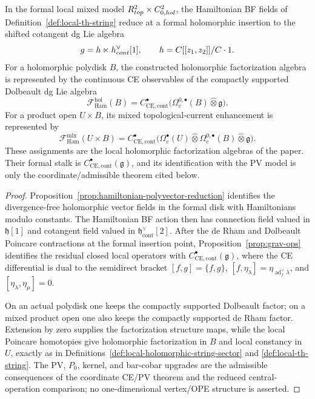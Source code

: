 \documentclass[11pt]{memoir}
\begin{document}
\begin{prop}\label{prop:local-hamiltonian-factorization-observables}
  In the formal local mixed model
  \(R^2_{top}\times C^2_{0,hol}\), the
  Hamiltonian BF fields of Definition~\ref{def:local-th-string} reduce
  at a formal holomorphic insertion to the shifted cotangent dg Lie
  algebra
  \[
    g=h\ltimes
    h^\vee_{cont}[1],
    \qquad
    h=C[[z_1,z_2]]/C\cdot1 .
  \]
  For a holomorphic polydisk \(B\), the constructed holomorphic
  factorization algebra is represented by the continuous CE observables
  of the compactly supported Dolbeault dg Lie algebra
  \[
    \mathcal F_{\mathrm{Ham}}^{\mathrm{hol}}(B)
    =
    C^\bullet_{\mathrm{CE},\mathrm{cont}}
    \bigl(\Omega_c^{0,\bullet}(B)\widehat\otimes\mathfrak g\bigr).
  \]
  For a product open \(U\times B\), its mixed topological-current
  enhancement is represented by
  \[
    \mathcal F_{\mathrm{Ham}}^{\mathrm{mix}}(U\times B)
    =
    C^\bullet_{\mathrm{CE},\mathrm{cont}}
    \bigl(
      \Omega_c^\bullet(U)\widehat\otimes
      \Omega_c^{0,\bullet}(B)\widehat\otimes\mathfrak g
    \bigr).
  \]
  These assignments are the local holomorphic factorization algebras of
  the paper.  Their formal stalk is
  \(C^\bullet_{\mathrm{CE},\mathrm{cont}}(\mathfrak g)\), and its
  identification with the PV model is only the coordinate/admissible
  theorem cited below.
\end{prop}

\begin{proof}
  Proposition~\ref{prop:hamiltonian-polyvector-reduction} identifies the
  divergence-free holomorphic vector fields in the formal disk with
  Hamiltonians modulo constants.  The Hamiltonian BF action then has
  connection field valued in \(\mathfrak h[1]\) and cotangent field valued
  in \(\mathfrak h^\vee_{\mathrm{cont}}[2]\).  After the de Rham and
  Dolbeault Poincare contractions at the formal insertion point,
  Proposition~\ref{prop:grav-ops} identifies the residual closed local
  operators with
  \(C^\bullet_{\mathrm{CE},\mathrm{cont}}(\mathfrak g)\), where the CE
  differential is dual to the semidirect bracket
  \([f,g]=\{f,g\}\), \([f,\eta_\lambda]
  =\eta_{\operatorname{ad}^{\vee}_f\lambda}\), and
  \([\eta_\lambda,\eta_\mu]=0\).

  On an actual polydisk one keeps the compactly supported Dolbeault
  factor; on a mixed product open one also keeps the compactly supported
  de Rham factor.  Extension by zero supplies the factorization structure
  maps, while the local Poincare homotopies give holomorphic
  factorization in \(B\) and local constancy in \(U\), exactly as in
  Definitions~\ref{def:local-holomorphic-string-sector} and
  \ref{def:local-th-string}.  The PV, \(P_0\), kernel, and bar-cobar
  upgrades are the admissible consequences of the coordinate CE/PV theorem
  and the reduced central-operation comparison; no one-dimensional
  vertex/OPE structure is asserted.
\end{proof}
\end{document}
